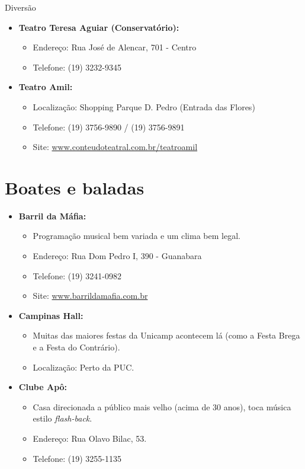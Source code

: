 \begin{story}{Diversão}
\begin{itemize}
\item \textbf{Teatro Teresa Aguiar (Conservatório):}
\begin{itemize}
\item Endereço: Rua José de Alencar, 701 - Centro
\item Telefone: (19) 3232-9345
\end{itemize}

\item \textbf{Teatro Amil:}
\begin{itemize}
\item Localização: Shopping Parque D. Pedro (Entrada das Flores)
\item Telefone: (19) 3756-9890 / (19) 3756-9891
\item Site: \url{www.conteudoteatral.com.br/teatroamil}
\end{itemize}

\end{itemize}

\section*{Boates e baladas}

\begin{itemize}

\item \textbf{Barril da Máfia:}
\begin{itemize}
\item Programação musical bem variada e um clima bem legal.
\item Endereço: Rua Dom Pedro I, 390 - Guanabara
\item Telefone: (19) 3241-0982
\item Site: \url{www.barrildamafia.com.br}
\end{itemize}

\item \textbf{Campinas Hall:}
\begin{itemize}
\item Muitas das maiores festas da Unicamp acontecem lá (como a Festa Brega e a Festa do Contrário).
\item Localização: Perto da PUC.
\end{itemize}

\item \textbf{Clube Apô:}
\begin{itemize}
\item Casa direcionada a público mais velho (acima de 30 anos), toca música estilo \emph{flash-back}.
\item Endereço: Rua Olavo Bilac, 53.
\item Telefone: (19) 3255-1135
\end{itemize}


\end{itemize}
\end{story}

